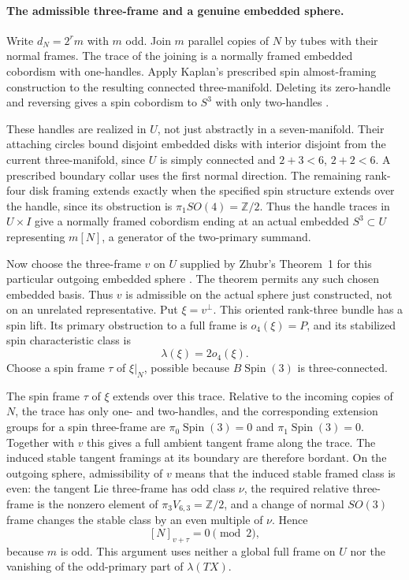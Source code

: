 \paragraph{The admissible three-frame and a genuine embedded sphere.}
Write $d_N=2^r m$ with $m$ odd. Join $m$ parallel copies of $N$ by tubes with their
normal frames. The trace of the joining is a normally framed
embedded cobordism with one-handles. Apply Kaplan's prescribed
spin almost-framing construction to the resulting connected
three-manifold. Deleting its zero-handle and reversing gives a
spin cobordism to $S^3$ with only two-handles
\cite[Definition 1.7, Remark 1.8, and Theorem 3.1, pp.239, 243--246]{mapsKaplan79}.

These handles are realized in $U$, not just abstractly in a
seven-manifold. Their attaching circles bound disjoint embedded
disks with interior disjoint from the current three-manifold,
since $U$ is simply connected and $2+3<6$, $2+2<6$. A prescribed
boundary collar uses the first normal direction. The remaining
rank-four disk framing extends exactly when the specified spin
structure extends over the handle, since its obstruction is
$\pi_1SO(4)=\mathbb Z/2$. Thus the handle traces in $U\times I$
give a normally framed cobordism ending at an actual embedded
$S^3\subset U$ representing $m[N]$, a generator of the
two-primary summand.

Now choose the three-frame $v$ on $U$ supplied by Zhubr's
Theorem~1 for this particular outgoing embedded sphere
\cite[Theorem 1, p.6]{ffZhubr13}. The
theorem permits any such chosen embedded basis. Thus $v$ is
admissible on the actual sphere just constructed, not on an
unrelated representative. Put $\xi=v^\perp$. This oriented
rank-three bundle has a spin lift. Its primary obstruction to
a full frame is $o_4(\xi)=P$, and its stabilized spin
characteristic class is
\[
                              \lambda(\xi)=2o_4(\xi).
\tag{D.RP4}
\]
Choose a spin frame $\tau$ of $\xi|_N$, possible because
$B\operatorname{Spin}(3)$ is three-connected.

The spin frame $\tau$ of $\xi$ extends over this trace. Relative
to the incoming copies of $N$, the trace has only one- and
two-handles, and the corresponding extension groups for a spin
three-frame are $\pi_0\operatorname{Spin}(3)=0$ and
$\pi_1\operatorname{Spin}(3)=0$. Together with $v$ this gives a
full ambient tangent frame along the trace. The induced stable
tangent framings at its boundary are therefore bordant. On the
outgoing sphere, admissibility of $v$ means that the induced
stable framed class is even: the tangent Lie three-frame has
odd class $\nu$, the required relative three-frame is the
nonzero element of $\pi_3V_{6,3}=\mathbb Z/2$, and a change of
normal $SO(3)$ frame changes the stable class by an even multiple
of $\nu$. Hence
\[
                             [N]_{v+\tau}=0\pmod2,
\tag{D.RP5}
\]
because $m$ is odd. This argument uses neither a global full
frame on $U$ nor the vanishing of the odd-primary part of
$\lambda(TX)$.

